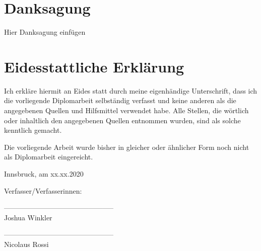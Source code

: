 \section*{Danksagung}

Hier Danksagung einfügen

\section*{Eidesstattliche Erklärung}

Ich erkläre hiermit an Eides statt durch meine eigenhändige Unterschrift, dass ich die vorliegende Diplomarbeit selbständig verfasst und keine anderen als die angegebenen Quellen und Hilfsmittel verwendet habe. Alle Stellen, die wörtlich oder inhaltlich den angegebenen Quellen entnommen wurden, sind als solche kenntlich gemacht.

Die vorliegende Arbeit wurde bisher in gleicher oder ähnlicher Form noch nicht als Diplomarbeit eingereicht.



Innsbruck, am xx.xx.2020					   \\

\vspace*{3cm}



Verfasser/Verfasserinnen:

\vspace*{2cm}


-----------------------------------------------\\
\hspace*{1.3cm}           Joshua Winkler

\vspace*{2cm}


-----------------------------------------------\\
\hspace*{1.3cm}           Nicolaus Rossi



